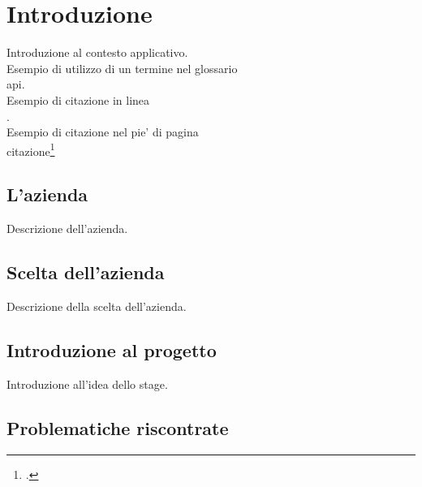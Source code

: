 
\chapter{Introduzione}
\label{cap:introduzione}

Introduzione al contesto applicativo.\\

\noindent Esempio di utilizzo di un termine nel glossario \\
\gls{api}. \\

\noindent Esempio di citazione in linea \\
\cite{site:agile-manifesto}. \\

\noindent Esempio di citazione nel pie' di pagina \\
citazione\footcite{womak:lean-thinking} \\

\section{L'azienda}

Descrizione dell'azienda.

\section{Scelta dell'azienda}

Descrizione della scelta dell'azienda.

\section{Introduzione al progetto}

Introduzione all'idea dello stage.

\section{Problematiche riscontrate}

